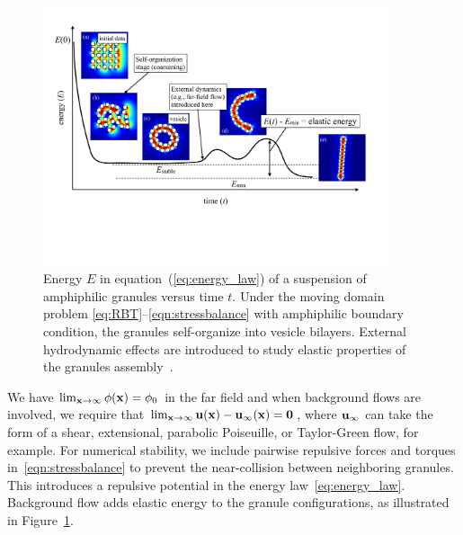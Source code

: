 \begin{figure} 
  \vspace{-10pt}
  \includegraphics[width=4in]{figures/Background/coarsening.pdf}
  \vspace{-25pt}
  \caption{\label{fig:coarsening} \footnotesize Energy $E$ in
  equation~(\ref{eq:energy_law}) of a suspension of amphiphilic granules
  versus time $t$. Under the moving domain problem
  \eqref{eq:RBT}--\eqref{eqn:stressbalance} with amphiphilic boundary
  condition, the granules self-organize into vesicle bilayers. External
  hydrodynamic effects are introduced to study elastic properties of
  the granules assembly~\cite{Fu2018_SIAM,FuQuRyYo22}.}
\end{figure}

We have $\lim_{\mathbf{x} \to \infty} \phi(\mathbf{x}) = \phi_0$ in the far field and
when background flows are involved, we require that $\lim_{\mathbf{x} \to
\infty} \mathbf{u}(\mathbf{x}) - \mathbf{u}_{\infty}(\mathbf{x}) = \mathbf{0}$, where $\mathbf{u}_{\infty}$
can take the form
of a shear, extensional, parabolic Poiseuille, or Taylor-Green flow, for
example. For numerical stability, we include pairwise repulsive forces
and torques in~\eqref{eqn:stressbalance} to prevent the near-collision
between neighboring granules. This introduces a repulsive potential in
the energy law~\eqref{eq:energy_law}. Background flow adds elastic
energy to the granule configurations, as illustrated in
Figure~\ref{fig:coarsening}.

